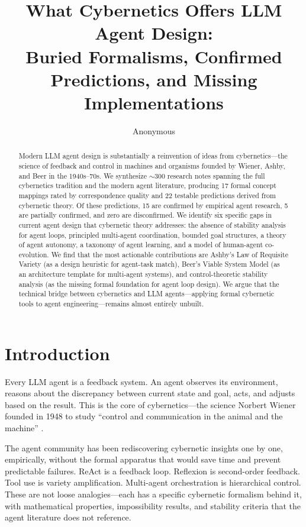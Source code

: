 \documentclass[11pt]{article}
\title{What Cybernetics Offers LLM Agent Design:\\Buried Formalisms, Confirmed Predictions, and Missing Implementations}
\author{Anonymous}
\begin{document}
\maketitle

\begin{abstract}
Modern LLM agent design is substantially a reinvention of ideas from cybernetics---the science of feedback and control in machines and organisms founded by Wiener, Ashby, and Beer in the 1940s--70s.
We synthesize ${\sim}$300 research notes spanning the full cybernetics tradition and the modern agent literature, producing 17 formal concept mappings rated by correspondence quality and 22 testable predictions derived from cybernetic theory.
Of these predictions, 15 are confirmed by empirical agent research, 5 are partially confirmed, and zero are disconfirmed.
We identify six specific gaps in current agent design that cybernetic theory addresses: the absence of stability analysis for agent loops, principled multi-agent coordination, bounded goal structures, a theory of agent autonomy, a taxonomy of agent learning, and a model of human-agent co-evolution.
We find that the most actionable contributions are Ashby's Law of Requisite Variety (as a design heuristic for agent-task match), Beer's Viable System Model (as an architecture template for multi-agent systems), and control-theoretic stability analysis (as the missing formal foundation for agent loop design).
We argue that the technical bridge between cybernetics and LLM agents---applying formal cybernetic tools to agent engineering---remains almost entirely unbuilt.
\end{abstract}

\section{Introduction}

Every LLM agent is a feedback system. An agent observes its environment, reasons about the discrepancy between current state and goal, acts, and adjusts based on the result. This is the core of cybernetics---the science Norbert Wiener founded in 1948 to study ``control and communication in the animal and the machine'' \cite{wiener1948cybernetics}.

The agent community has been rediscovering cybernetic insights one by one, empirically, without the formal apparatus that would save time and prevent predictable failures. ReAct \cite{yao2023react} is a feedback loop. Reflexion \cite{shinn2023reflexion} is second-order feedback. Tool use is variety amplification. Multi-agent orchestration is hierarchical control. These are not loose analogies---each has a specific cybernetic formalism behind it, with mathematical properties, impossibility results, and stability criteria that the agent literature does not reference.
\end{document}
